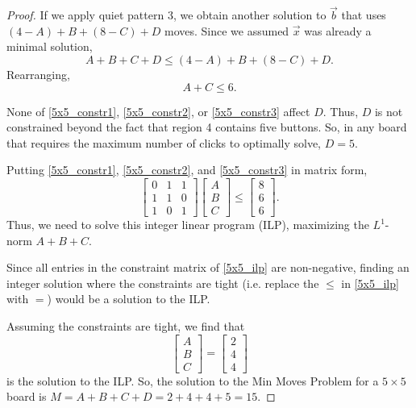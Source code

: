 \documentclass[a4paper]{article}
\begin{document}
\begin{proof}
		If we apply quiet pattern 3, we obtain another solution to $\vec{b}$ that uses $(4 - A) + B + (8 - C) + D$ moves.
		Since we assumed $\vec{x}$ was already a minimal solution,
		\begin{equation*}
			A + B + C + D \leq (4 - A) + B + (8 - C) + D.
		\end{equation*}
		Rearranging,
		\begin{equation}\label{5x5_constr3}
			A + C \leq 6.
		\end{equation}
	
		None of \eqref{5x5_constr1}, \eqref{5x5_constr2}, or \eqref{5x5_constr3} affect $D$.
		Thus, $D$ is not constrained beyond the fact that region 4 contains five buttons.
		So, in any board that requires the maximum number of clicks to optimally solve, $D = 5$.
	
		Putting \eqref{5x5_constr1}, \eqref{5x5_constr2}, and \eqref{5x5_constr3} in matrix form,
		\begin{equation}\label{5x5_ilp}
			\begin{bmatrix}
				0 & 1 & 1 \\
				1 & 1 & 0 \\
				1 & 0 & 1
			\end{bmatrix}
			\begin{bmatrix}
				A \\
				B \\
				C
			\end{bmatrix}
			\leq
			\begin{bmatrix}
				8 \\
				6 \\
				6
			\end{bmatrix}.
		\end{equation}
		Thus, we need to solve this integer linear program (ILP), maximizing the $L^1$-norm $A + B + C$.
		
		Since all entries in the constraint matrix of \eqref{5x5_ilp} are non-negative, finding an integer solution where the constraints are tight (i.e. replace the $\leq$ in \eqref{5x5_ilp} with $=$) would be a solution to the ILP.
		
		Assuming the constraints are tight, we find that
		\begin{equation*}
			\begin{bmatrix}
				A \\
				B \\
				C
			\end{bmatrix}
			=
			\begin{bmatrix}
				2 \\
				4 \\
				4
			\end{bmatrix}
		\end{equation*}
		is the solution to the ILP.
		So, the solution to the Min Moves Problem for a $5 \times 5$ board is $M = A + B + C + D = 2 + 4 + 4 + 5 = 15$.
	\end{proof}
\end{document}
